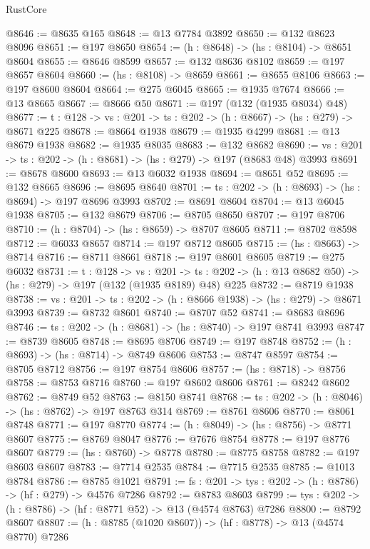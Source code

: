 \begin{lexlean}{RustCore}
\begin{coremodule}
@8646 := @8635 @165
@8648 := @13 @7784 @3892
@8650 := @132 @8623 @8096
@8651 := @197 @8650
@8654 := (h : @8648) -> (hs : @8104) -> @8651 @8604
@8655 := @8646 @8599
@8657 := @132 @8636 @8102
@8659 := @197 @8657 @8604
@8660 := (hs : @8108) -> @8659
@8661 := @8655 @8106
@8663 := @197 @8600 @8604
@8664 := @275 @6045
@8665 := @1935 @7674
@8666 := @13 @8665
@8667 := @8666 @50
@8671 := @197 (@132 (@1935 @8034) @48)
@8677 := {t : @128} -> {vs : @201} -> {ts : @202} -> (h : @8667) -> (hs : @279) -> @8671 @225
@8678 := @8664 @1938
@8679 := @1935 @4299
@8681 := @13 @8679 @1938
@8682 := @1935 @8035
@8683 := @132 @8682
@8690 := {vs : @201} -> {ts : @202} -> (h : @8681) -> (hs : @279) -> @197 (@8683 @48) @3993
@8691 := @8678 @8600
@8693 := @13 @6032 @1938
@8694 := @8651 @52
@8695 := @132 @8665
@8696 := @8695 @8640
@8701 := {ts : @202} -> (h : @8693) -> (hs : @8694) -> @197 @8696 @3993
@8702 := @8691 @8604
@8704 := @13 @6045 @1938
@8705 := @132 @8679
@8706 := @8705 @8650
@8707 := @197 @8706
@8710 := (h : @8704) -> (hs : @8659) -> @8707 @8605
@8711 := @8702 @8598
@8712 := @6033 @8657
@8714 := @197 @8712 @8605
@8715 := (hs : @8663) -> @8714
@8716 := @8711 @8661
@8718 := @197 @8601 @8605
@8719 := @275 @6032
@8731 := {t : @128} ->
  {vs : @201} ->
  {ts : @202} -> (h : @13 @8682 @50) -> (hs : @279) -> @197 (@132 (@1935 @8189) @48) @225
@8732 := @8719 @1938
@8738 := {vs : @201} -> {ts : @202} -> (h : @8666 @1938) -> (hs : @279) -> @8671 @3993
@8739 := @8732 @8601
@8740 := @8707 @52
@8741 := @8683 @8696
@8746 := {ts : @202} -> (h : @8681) -> (hs : @8740) -> @197 @8741 @3993
@8747 := @8739 @8605
@8748 := @8695 @8706
@8749 := @197 @8748
@8752 := (h : @8693) -> (hs : @8714) -> @8749 @8606
@8753 := @8747 @8597
@8754 := @8705 @8712
@8756 := @197 @8754 @8606
@8757 := (hs : @8718) -> @8756
@8758 := @8753 @8716
@8760 := @197 @8602 @8606
@8761 := @8242 @8602
@8762 := @8749 @52
@8763 := @8150 @8741
@8768 := {ts : @202} -> (h : @8046) -> (hs : @8762) -> @197 @8763 @314
@8769 := @8761 @8606
@8770 := @8061 @8748
@8771 := @197 @8770
@8774 := (h : @8049) -> (hs : @8756) -> @8771 @8607
@8775 := @8769 @8047
@8776 := @7676 @8754
@8778 := @197 @8776 @8607
@8779 := (hs : @8760) -> @8778
@8780 := @8775 @8758
@8782 := @197 @8603 @8607
@8783 := @7714 @2535
@8784 := @7715 @2535
@8785 := @1013 @8784
@8786 := @8785 @1021
@8791 := {fs : @201} -> {tys : @202} -> (h : @8786) -> (hf : @279) -> @4576 @7286
@8792 := @8783 @8603
@8799 := {tys : @202} -> (h : @8786) -> (hf : @8771 @52) -> @13 (@4574 @8763) @7286
@8800 := @8792 @8607
@8807 := (h : @8785 (@1020 @8607)) -> (hf : @8778) -> @13 (@4574 @8770) @7286

\end{coremodule}
\end{lexlean}
